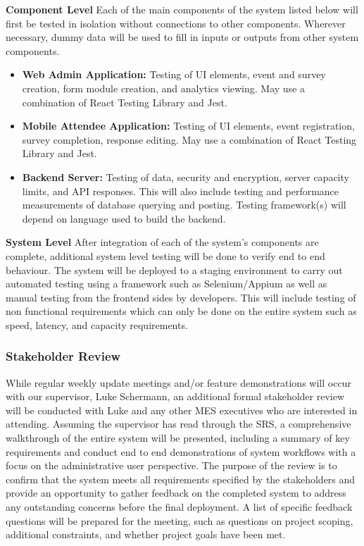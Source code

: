 \documentclass[12pt, titlepage]{article}
\begin{document}
\textbf{Component Level}
Each of the main components of the system listed below will first be tested in isolation without connections to other components. Wherever necessary, dummy data will be used to fill in inputs or outputs from other system components.
\begin{itemize}
  \item \textbf{Web Admin Application:} Testing of UI elements, event and survey creation, form module creation, and analytics viewing. May use a combination of React Testing Library and Jest.
  \item \textbf{Mobile Attendee Application:} Testing of UI elements, event registration, survey completion, response editing. May use a combination of React Testing Library and Jest.
  \item \textbf{Backend Server:} Testing of data, security and encryption, server capacity limits, and API responses. This will also include testing and performance measurements of database querying and posting. Testing framework(s) will depend on language used to build the backend. 
\end{itemize}

\textbf{System Level}
  After integration of each of the system's components are complete, additional system level testing will be done to verify end to end behaviour. The system will be deployed to a staging environment to carry out automated testing using a framework such as Selenium/Appium as well as manual testing from the frontend sides by developers. This will include testing of non functional requirements which can only be done on the entire system such as speed, latency, and capacity requirements.

\subsubsection{Stakeholder Review}
  While regular weekly update meetings and/or feature demonstrations will occur with our supervisor, Luke Schermann, an additional formal stakeholder review will be conducted with Luke and any other MES executives who are interested in attending. Assuming the supervisor has read through the SRS, a comprehensive walkthrough of the entire system will be presented, including a summary of key requirements and conduct end to end demonstrations of system workflows with a focus on the administrative user perspective. The purpose of the review is to confirm that the system meets all requirements specified by the stakeholders and provide an opportunity to gather feedback on the completed system to address any outstanding concerns before the final deployment. A list of specific feedback questions will be prepared for the meeting, such as questions on project scoping, additional constraints, and whether project goals have been met.
  
\end{document}
